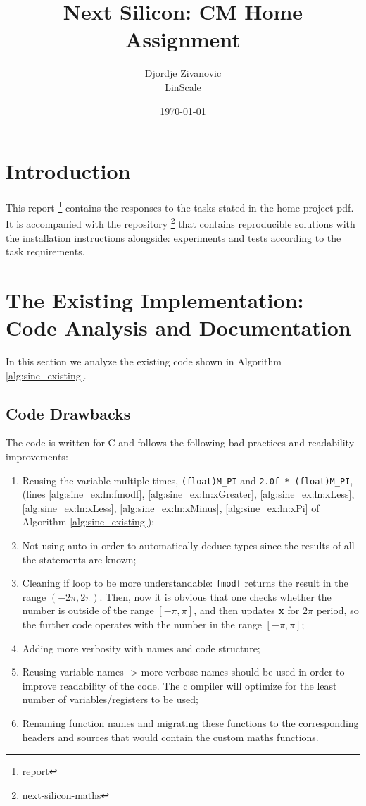 \documentclass[12pt]{article}
\title{Next Silicon: CM Home Assignment}
\author{Djordje Zivanovic \\ \small{LinScale}}
\date{\today}
\begin{document}
\maketitle
\tableofcontents
\newpage

\section{Introduction}
This report \footnote{\href{https://github.com/popina1994/Next-Silicon-Report}{report}} contains the responses to the tasks stated in the home project pdf.
It is accompanied with the repository \footnote{\href{https://github.com/popina1994/next-silicon-maths}{next-silicon-maths}} that contains reproducible solutions with the installation instructions alongside: experiments and tests according to the task requirements.
\section{The Existing Implementation: Code Analysis and Documentation}
In this section we analyze the existing code shown in Algorithm \ref{alg:sine_existing}.

\subsection{Code Drawbacks}
The code is written for C and follows the following bad practices and readability improvements:
\begin{enumerate}
    \item Reusing the variable multiple times,  \texttt{(float)M\_PI} and \texttt{2.0f * (float)M\_PI}, (lines \ref{alg:sine_ex:ln:fmodf}, \ref{alg:sine_ex:ln:xGreater}, \ref{alg:sine_ex:ln:xLess}, \ref{alg:sine_ex:ln:xLess}, \ref{alg:sine_ex:ln:xMinus}, \ref{alg:sine_ex:ln:xPi} of Algorithm \ref{alg:sine_existing});
    \item Not using auto in order to automatically deduce types since the results of all the statements are known;
    \item Cleaning if loop to be more understandable: \texttt{fmodf} returns the result in the range $(-2 \pi, 2 \pi)$. Then, now it is obvious that one checks whether the number is outside of the range $[-\pi, \pi]$, and then updates \textbf{x} for $2 \pi$ period, so the further code operates with the number in the range $[-\pi, \pi]$;
    \item Adding more verbosity with names and code structure;
    \item Reusing variable names -> more verbose names should be used in order to improve readability of the code. The c ompiler will optimize for the least number of variables/registers to be used;
    \item Renaming function names and migrating these functions to the corresponding headers and sources that would contain the custom maths functions.
\end{enumerate}
\end{document}
